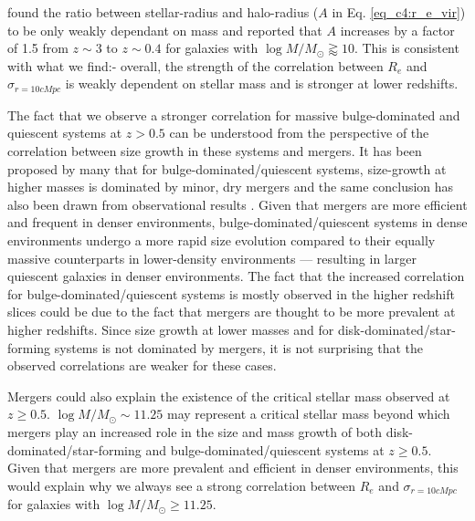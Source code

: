 \citet{somerville18} found the ratio between stellar-radius and halo-radius ($A$ in Eq. \ref{eq_c4:r_e_vir}) to be only weakly dependant on mass and reported that $A$ increases by a factor of 1.5 from $z\sim3$ to $z\sim0.4$ for galaxies with $\log M/M_{\odot} \gtrapprox 10$. This is consistent with what we find:- overall, the strength of the correlation between $R_e$ and $\sigma_{r=10cMpc}$ is weakly dependent on stellar mass and is stronger at lower redshifts. 

The fact that we observe a stronger correlation for massive bulge-dominated and quiescent systems at $z > 0.5$ can be understood from the perspective of the correlation between size growth in these systems and mergers. It has been proposed by many that for bulge-dominated/quiescent systems, size-growth at higher masses is dominated by minor, dry mergers \citep[e.g.,][]{shankar13} and the same conclusion has also been drawn from observational results \citep[e.g.,][]{mowla19,hsc_mass_size}. Given that mergers are more efficient and frequent in denser environments, bulge-dominated/quiescent systems in dense environments undergo a more rapid size evolution compared to their equally massive counterparts in lower-density environments --- resulting in larger quiescent galaxies in denser environments. The fact that the increased correlation for bulge-dominated/quiescent systems is mostly observed in the higher redshift slices could be due to the fact that mergers are thought to be more prevalent at higher redshifts. Since size growth at lower masses and for disk-dominated/star-forming systems is not dominated by mergers, it is not surprising that the observed correlations are weaker for these cases. 


Mergers could also explain the existence of the critical stellar mass observed at $z \geq 0.5$. $\log M/M_{\odot} \sim 11.25$ may represent a critical stellar mass beyond which mergers play an increased role in the size and mass growth of both disk-dominated/star-forming and bulge-dominated/quiescent systems at $z \geq 0.5$. Given that mergers are more prevalent and efficient in denser environments, this would explain why we always see a strong correlation between $R_e$ and $\sigma_{r=10cMpc}$ for galaxies with $\log M/M_{\odot} \geq 11.25$.


